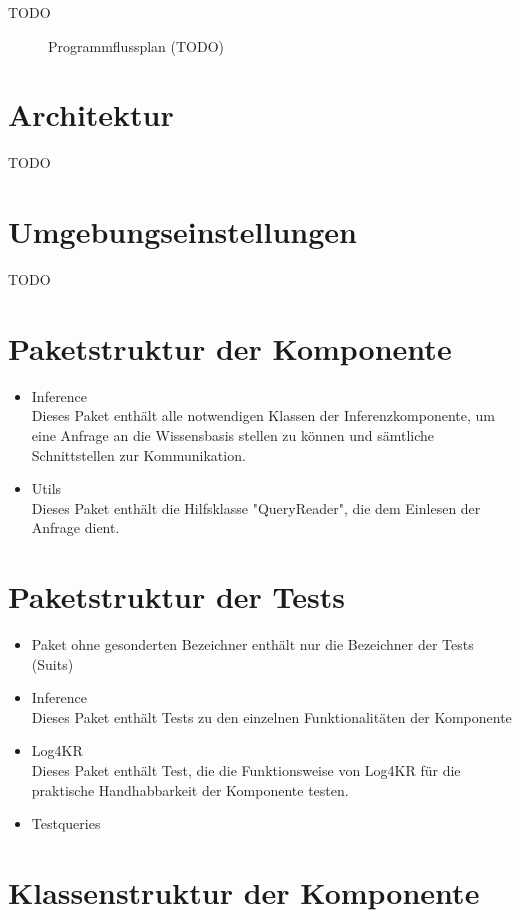 \documentclass[a4paper, 11pt]{book}
\begin{document}
TODO 

\begin{figure}[h]
	
	\caption{Programmflussplan (TODO)}
\end{figure}


\section{Architektur}
TODO

\section{Umgebungseinstellungen}
TODO

\section{Paketstruktur der Komponente}
\begin{itemize}
	\item Inference\\
	Dieses Paket enthält alle notwendigen Klassen der Inferenzkomponente, um eine Anfrage an die Wissensbasis stellen zu können und sämtliche Schnittstellen zur Kommunikation. 
	\item Utils\\
	Dieses Paket enthält die Hilfsklasse "{}QueryReader"{}, die dem Einlesen der Anfrage dient.
\end{itemize}

\section{Paketstruktur der Tests}
\begin{itemize}
	\item{Paket ohne gesonderten Bezeichner}
	enthält nur die Bezeichner der Tests (Suits)
	\item{Inference}\\
	Dieses Paket enthält Tests zu den einzelnen Funktionalitäten der Komponente
	\item{Log4KR}\\
	Dieses Paket enthält Test, die die Funktionsweise von Log4KR für die praktische Handhabbarkeit der Komponente testen.
	\item{Testqueries}
\end{itemize}

\section{Klassenstruktur der Komponente}
\end{document}
